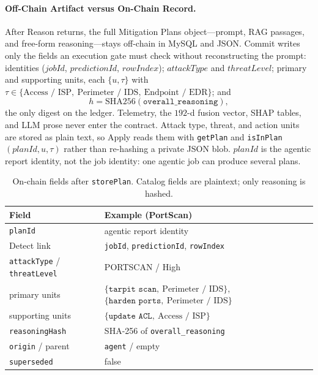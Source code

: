 \documentclass[10pt, conference]{IEEEtran}
\begin{document}
\paragraph{Off-Chain Artifact versus On-Chain Record.}
After Reason returns, the full Mitigation Plans object---prompt, RAG passages, and free-form reasoning---stays off-chain in MySQL and JSON. Commit writes only the fields an execution gate must check without reconstructing the prompt: identities ($\mathit{jobId}$, $\mathit{predictionId}$, $\mathit{rowIndex}$); $\mathit{attackType}$ and $\mathit{threatLevel}$; primary and supporting units, each $\{u,\tau\}$ with $\tau\in\{\text{Access~/~ISP},\ \text{Perimeter~/~IDS},\ \text{Endpoint~/~EDR}\}$; and
\begin{equation}
h=\mathrm{SHA256}(\texttt{overall\_reasoning}),
\label{eq:reasoning-hash}
\end{equation}
the only digest on the ledger. Telemetry, the $192$-d fusion vector, SHAP tables, and LLM prose never enter the contract. Attack type, threat, and action units are stored as plain text, so Apply reads them with \texttt{getPlan} and \texttt{isInPlan}$(\mathit{planId},u,\tau)$ rather than re-hashing a private JSON blob. $\mathit{planId}$ is the agentic report identity, not the job identity: one agentic job can produce several plans.

\begin{table}[t]
\caption{On-chain fields after \texttt{storePlan}. Catalog fields are plaintext; only reasoning is hashed.}
\label{tab:onchain-plan}
\centering
\begin{tabular}{p{}p{}}
\hline
Field & Example (PortScan) \\
\hline
\texttt{planId} & agentic report identity \\
Detect link & \texttt{jobId}, \texttt{predictionId}, \texttt{rowIndex} \\
\texttt{attackType} / \texttt{threatLevel} & PORTSCAN / High \\
primary units & $\{\texttt{tarpit scan},\ \text{Perimeter~/~IDS}\}$, $\{\texttt{harden ports},\ \text{Perimeter~/~IDS}\}$ \\
supporting units & $\{\texttt{update ACL},\ \text{Access~/~ISP}\}$ \\
\texttt{reasoningHash} & SHA-256 of \texttt{overall\_reasoning} \\
\texttt{origin} / parent & \texttt{agent} / empty \\
\texttt{superseded} & false \\
\hline
\end{tabular}
\end{table}
\end{document}
